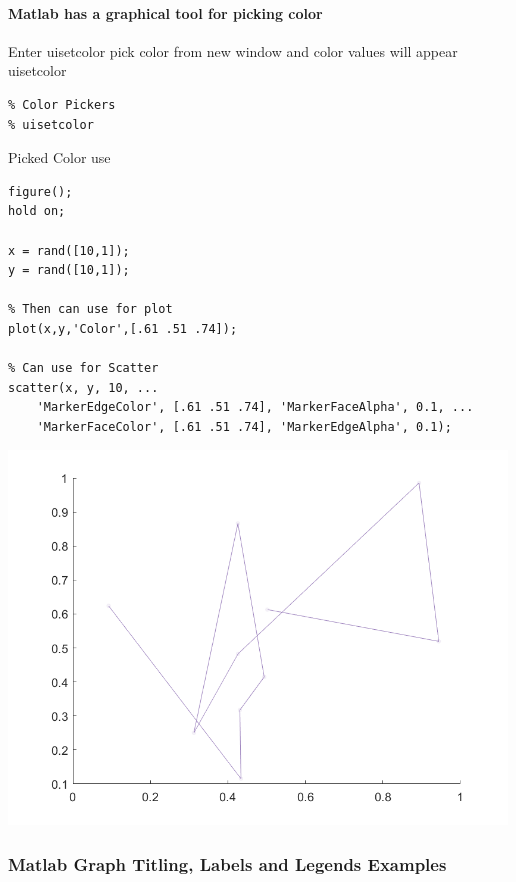 \documentclass[
]{book}
\begin{document}
\hypertarget{matlab-has-a-graphical-tool-for-picking-color}{%
\paragraph{Matlab has a graphical tool for picking color}\label{matlab-has-a-graphical-tool-for-picking-color}}

Enter uisetcolor pick color from new window and color values will appear
uisetcolor

\begin{verbatim}
% Color Pickers
% uisetcolor
\end{verbatim}

Picked Color use

\begin{verbatim}
figure();
hold on;

x = rand([10,1]);
y = rand([10,1]);

% Then can use for plot
plot(x,y,'Color',[.61 .51 .74]);

% Can use for Scatter
scatter(x, y, 10, ...
    'MarkerEdgeColor', [.61 .51 .74], 'MarkerFaceAlpha', 0.1, ...
    'MarkerFaceColor', [.61 .51 .74], 'MarkerEdgeAlpha', 0.1);
\end{verbatim}

\includegraphics[width=5.20833in,height=\textheight]{img/fs_color_images/figure_12.png}

\hypertarget{matlab-graph-titling-labels-and-legends-examples}{%
\subsubsection{Matlab Graph Titling, Labels and Legends Examples}\label{matlab-graph-titling-labels-and-legends-examples}}
\end{document}
